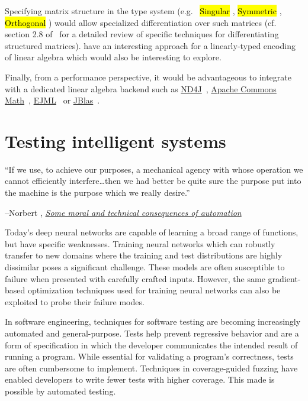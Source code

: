 \documentclass[12pt,initial,twoside,maitrise]{dms}
\newcommand{\inline}[1]{%
    \begingroup%
    \sethlcolor{slightgray}%
    \hl{\ttfamily\small #1}%
    \endgroup
}
\numberwithin{equation}{section}
\numberwithin{table}{chapter}
\numberwithin{figure}{chapter}
\begin{document}
Specifying matrix structure in the type system (e.g.\ \inline{Singular}, \inline{Symmetric}, \inline{Orthogonal}) would allow specialized differentiation over such matrices (cf. section 2.8 of~\citet{petersen2012matrix} for a detailed review of specific techniques for differentiating structured matrices). \citet{makwana2018numlin} have an interesting approach for a linearly-typed encoding of linear algebra which would also be interesting to explore.

Finally, from a performance perspective, it would be advantageous to integrate with a dedicated linear algebra backend such as \href{https://deeplearning4j.org/docs/latest/nd4j-overview}{ND4J}~\citep{team2016nd4j}, \href{https://commons.apache.org/proper/commons-math/}{Apache Commons Math}~\citep{developers2012apache}, \href{http://ejml.org}{EJML}~\citep{abeles2010efficient} or \href{http://jblas.org/}{JBlas}~\citep{braun2011jblas}.

\chapter{Testing intelligent systems}\label{ch:difftest}

\setlength{\epigraphwidth}{0.80\textwidth}
\epigraph{``If we use, to achieve our purposes, a mechanical agency with whose operation we cannot efficiently interfere\ldots then we had better be quite sure the purpose put into the machine is the purpose which we really desire.''}{\begin{flushright}--Norbert \citet{wiener1960some}, \href{https://www.ias.ac.in/article/fulltext/reso/004/01/0080-0088}{\textit{Some moral and technical consequences of automation}}~\end{flushright}}

Today's deep neural networks are capable of learning a broad range of functions, but have specific weaknesses. Training neural networks which can robustly transfer to new domains where the training and test distributions are highly dissimilar poses a significant challenge. These models are often susceptible to failure when presented with carefully crafted inputs. However, the same gradient-based optimization techniques used for training neural networks can also be exploited to probe their failure modes.

In software engineering, techniques for software testing are becoming increasingly automated and general-purpose. Tests help prevent regressive behavior and are a form of specification in which the developer communicates the intended result of running a program. While essential for validating a program's correctness, tests are often cumbersome to implement. Techniques in coverage-guided fuzzing have enabled developers to write fewer tests with higher coverage. This made is possible by automated testing.
\end{document}

